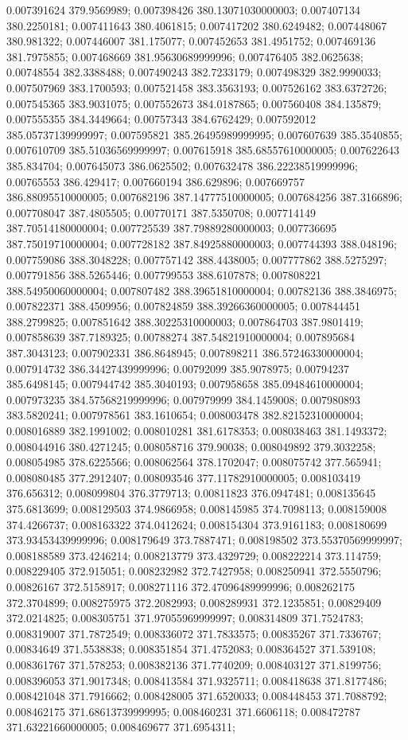 0.007391624 379.9569989; 0.007398426 380.13071030000003; 0.007407134 380.2250181; 0.007411643 380.4061815; 0.007417202 380.6249482; 0.007448067 380.981322; 0.007446007 381.175077; 0.007452653 381.4951752; 0.007469136 381.7975855; 0.007468669 381.95630689999996; 0.007476405 382.0625638; 0.00748554 382.3388488; 0.007490243 382.7233179; 0.007498329 382.9990033; 0.007507969 383.1700593; 0.007521458 383.3563193; 0.007526162 383.6372726; 0.007545365 383.9031075; 0.007552673 384.0187865; 0.007560408 384.135879; 0.007555355 384.3449664; 0.00757343 384.6762429; 0.007592012 385.05737139999997; 0.007595821 385.26495989999995; 0.007607639 385.3540855; 0.007610709 385.51036569999997; 0.007615918 385.68557610000005; 0.007622643 385.834704; 0.007645073 386.0625502; 0.007632478 386.22238519999996; 0.00765553 386.429417; 0.007660194 386.629896; 0.007669757 386.88095510000005; 0.007682196 387.14777510000005; 0.007684256 387.3166896; 0.007708047 387.4805505; 0.00770171 387.5350708; 0.007714149 387.70514180000004; 0.007725539 387.79889280000003; 0.007736695 387.75019710000004; 0.007728182 387.84925880000003; 0.007744393 388.048196; 0.007759086 388.3048228; 0.007757142 388.4438005; 0.007777862 388.5275297; 0.007791856 388.5265446; 0.007799553 388.6107878; 0.007808221 388.54950060000004; 0.007807482 388.39651810000004; 0.00782136 388.3846975; 0.007822371 388.4509956; 0.007824859 388.39266360000005; 0.007844451 388.2799825; 0.007851642 388.30225310000003; 0.007864703 387.9801419; 0.007858639 387.7189325; 0.00788274 387.54821910000004; 0.007895684 387.3043123; 0.007902331 386.8648945; 0.007898211 386.57246330000004; 0.007914732 386.34427439999996; 0.00792099 385.9078975; 0.00794237 385.6498145; 0.007944742 385.3040193; 0.007958658 385.09484610000004; 0.007973235 384.57568219999996; 0.007979999 384.1459008; 0.007980893 383.5820241; 0.007978561 383.1610654; 0.008003478 382.82152310000004; 0.008016889 382.1991002; 0.008010281 381.6178353; 0.008038463 381.1493372; 0.008044916 380.4271245; 0.008058716 379.90038; 0.008049892 379.3032258; 0.008054985 378.6225566; 0.008062564 378.1702047; 0.008075742 377.565941; 0.008080485 377.2912407; 0.008093546 377.11782910000005; 0.008103419 376.656312; 0.008099804 376.3779713; 0.00811823 376.0947481; 0.008135645 375.6813699; 0.008129503 374.9866958; 0.008145985 374.7098113; 0.008159008 374.4266737; 0.008163322 374.0412624; 0.008154304 373.9161183; 0.008180699 373.93453439999996; 0.008179649 373.7887471; 0.008198502 373.55370569999997; 0.008188589 373.4246214; 0.008213779 373.4329729; 0.008222214 373.114759; 0.008229405 372.915051; 0.008232982 372.7427958; 0.008250941 372.5550796; 0.00826167 372.5158917; 0.008271116 372.47096489999996; 0.008262175 372.3704899; 0.008275975 372.2082993; 0.008289931 372.1235851; 0.00829409 372.0214825; 0.008305751 371.97055969999997; 0.008314809 371.7524783; 0.008319007 371.7872549; 0.008336072 371.7833575; 0.00835267 371.7336767; 0.00834649 371.5538838; 0.008351854 371.4752083; 0.008364527 371.539108; 0.008361767 371.578253; 0.008382136 371.7740209; 0.008403127 371.8199756; 0.008396053 371.9017348; 0.008413584 371.9325711; 0.008418638 371.8177486; 0.008421048 371.7916662; 0.008428005 371.6520033; 0.008448453 371.7088792; 0.008462175 371.68613739999995; 0.008460231 371.6606118; 0.008472787 371.63221660000005; 0.008469677 371.6954311; 